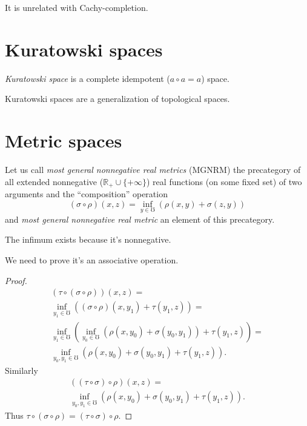 \begin{note}
It is unrelated with Cachy-completion.
\end{note}

\chapter{Kuratowski spaces}

\begin{defn}
\emph{Kuratowski space} is a complete idempotent ($a\circ a=a$) space.
\end{defn}

Kuratowski spaces are a generalization of topological spaces.

\chapter{Metric spaces}

Let us call \emph{most general nonnegative real metrics} (MGNRM) the precategory of all extended nonnegative ($\mathbb{R}_{+}\cup\{+\infty\}$) real functions (on some fixed set) of two arguments and the ``composition'' operation
\[ (\sigma\circ\rho)(x,z) = \inf_{y\in\mho}(\rho(x,y)+\sigma(z,y)) \]
and \emph{most general nonnegative real metric} an element of this precategory.

\begin{rem}
The infimum exists because it's nonnegative.
\end{rem}

We need to prove it's an associative operation.

\begin{proof}
\begin{multline*}
(\tau\circ(\sigma\circ\rho))(x,z) = \\
\inf_{y_1\in\mho}((\sigma\circ\rho)(x,y_1)+\tau(y_1,z)) = \\
\inf_{y_1\in\mho}(\inf_{y_0\in\mho}(\rho(x,y_0)+\sigma(y_0,y_1))+\tau(y_1,z)) = \\
\inf_{y_0,y_1\in\mho}(\rho(x,y_0)+\sigma(y_0,y_1)+\tau(y_1,z)).
\end{multline*}
Similarly 
\begin{multline*}
((\tau\circ\sigma)\circ\rho)(x,z) = \\
\inf_{y_0,y_1\in\mho}(\rho(x,y_0)+\sigma(y_0,y_1)+\tau(y_1,z)).
\end{multline*}
Thus $\tau\circ(\sigma\circ\rho)=(\tau\circ\sigma)\circ\rho$.
\end{proof}


